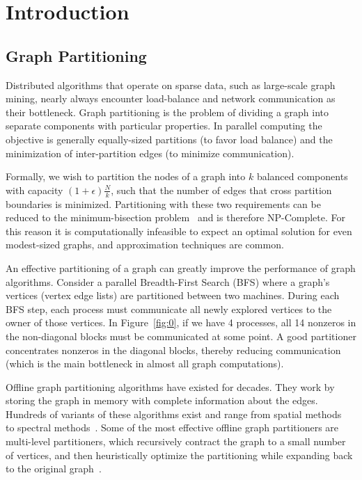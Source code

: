\section{Introduction}
\subsection{Graph Partitioning}
Distributed algorithms that operate on sparse data, such as large-scale graph mining, nearly always encounter load-balance and network communication as their bottleneck. Graph partitioning is the problem of dividing a graph into separate components with particular properties. In parallel computing the objective is generally equally-sized partitions (to favor load balance) and the minimization of inter-partition edges (to minimize communication).

Formally, we wish to partition the nodes of a graph into $k$ balanced components with capacity $(1+\epsilon)\frac{N}{k}$, such that the number of edges that cross partition boundaries is minimized. Partitioning with these two requirements can be reduced to the minimum-bisection problem~\cite{Garey:1979:CIG:578533} and is therefore NP-Complete. For this reason it is computationally infeasible to expect an optimal solution for even modest-sized graphs, and approximation techniques are common.

An effective partitioning of a graph can greatly improve the performance of graph algorithms. Consider a parallel Breadth-First Search (BFS) where a graph's vertices (vertex edge lists) are partitioned between two machines.
During each BFS step, each process must communicate all newly explored vertices to the owner of those vertices.
In Figure~\ref{fig:0}, if we have 4 processes, all 14 nonzeros in the non-diagonal blocks must be communicated at some point.
A good partitioner concentrates nonzeros in the diagonal blocks, thereby reducing communication (which is the main bottleneck in almost all graph computations).

Offline graph partitioning algorithms have existed for decades.
They work by storing the graph in memory with complete information about the edges.
Hundreds of variants of these algorithms exist and range from spatial methods~\cite{Gilbert95geometricmesh} to spectral methods~\cite{arora2009expander}.
Some of the most effective offline graph partitioners are multi-level partitioners, which recursively contract the graph to a small number of vertices, and then heuristically optimize the partitioning while expanding back to the original graph~\cite{karypis1998multilevel}.

